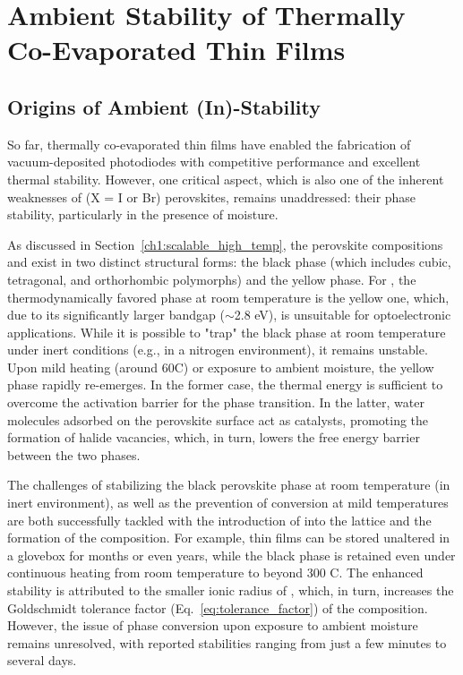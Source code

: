 \chapter{Ambient Stability of Thermally Co-Evaporated  Thin Films}\label{ch:stability}



\section{Origins of Ambient (In)-Stability}

So far, thermally co-evaporated  thin films have enabled the fabrication of vacuum-deposited photodiodes with competitive performance and excellent thermal stability. However, one critical aspect, which is also one of the inherent weaknesses of  (X = I or Br) perovskites, remains unaddressed: their phase stability, particularly in the presence of moisture. 

As discussed in Section~\ref{ch1:scalable_high_temp}, the perovskite compositions  and  exist in two distinct structural forms: the black phase (which includes cubic, tetragonal, and orthorhombic polymorphs) and the yellow phase. For , the thermodynamically favored phase at room temperature is the yellow one, which, due to its significantly larger bandgap ($\sim$2.8 eV), is unsuitable for optoelectronic applications. While it is possible to "trap" the black phase at room temperature under inert conditions (e.g., in a nitrogen environment), it remains unstable. Upon mild heating (around 60\degree C) or exposure to ambient moisture, the yellow phase rapidly re-emerges. In the former case, the thermal energy is sufficient to overcome the activation barrier for the phase transition. In the latter, water molecules adsorbed on the perovskite surface act as catalysts, promoting the formation of halide vacancies, which, in turn, lowers the free energy barrier between the two phases. 


The challenges of stabilizing the black perovskite phase at room temperature (in inert environment), as well as the prevention of conversion at mild temperatures are both successfully tackled with the introduction of  into the lattice and the formation of the  composition. For example,  thin films can be stored unaltered in a glovebox for months or even years, while the black phase is retained even under continuous heating from room temperature to beyond 300\degree 
C. The enhanced stability is attributed to the smaller ionic radius of , which, in turn, increases the Goldschmidt tolerance factor (Eq.~\ref{eq:tolerance_factor}) of the composition. However, the issue of phase conversion upon exposure to ambient moisture remains unresolved, with reported stabilities ranging from just a few minutes to several days. 

